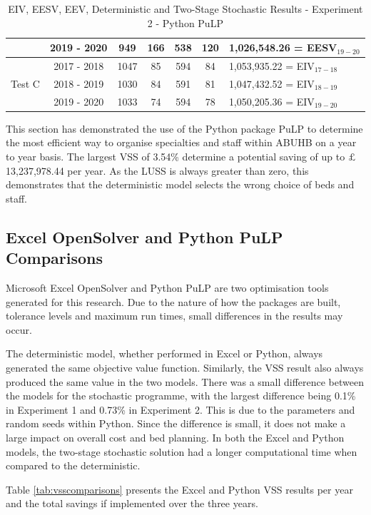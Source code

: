 \documentclass[../thesis.tex]{subfiles}
\begin{document}
\begin{table}[h!]
\begin{tabular}{ccccccl}
      & 2019 - 2020 &949 & 166 & 538 & 120 & 1,026,548.26 = EESV$_{19-20}$\\\midrule
       \multirow{3}{*}{Test C}& 2017 - 2018 &1047 & 85 & 594 & 84 & 1,053,935.22 = EIV$_{17-18}$\\
      & 2018 - 2019 &1030 & 84 & 591 & 81 & 1,047,432.52 = EIV$_{18-19}$\\
      & 2019 - 2020 &1033 & 74 & 594 & 78 & 1,050,205.36 = EIV$_{19-20}$\\\bottomrule      
    \end{tabular}
    \caption{EIV, EESV, EEV, Deterministic and Two-Stage Stochastic Results - Experiment 2 - Python PuLP}
    \label{tab:eiveesveevdetstocresultspy2}
\end{table}

This section has demonstrated the use of the Python package PuLP to determine the most efficient way to organise specialties and staff within ABUHB on a year to year basis. The largest VSS of 3.54\% determine a potential saving of up to $\pounds$13,237,978.44 per year. As the LUSS is always greater than zero, this demonstrates that the deterministic model selects the wrong choice of beds and staff.

\subsection{Excel OpenSolver and Python PuLP Comparisons}
Microsoft Excel OpenSolver and Python PuLP are two optimisation tools generated for this research. Due to the nature of how the packages are built, tolerance levels and maximum run times, small differences in the results may occur.

The deterministic model, whether performed in Excel or Python, always generated the same objective value function. Similarly, the VSS result also always produced the same value in the two models. There was a small difference between the models for the stochastic programme, with the largest difference being 0.1\% in Experiment 1 and 0.73\% in Experiment 2. This is due to the parameters and random seeds within Python. Since the difference is small, it does not make a large impact on overall cost and bed planning. In both the Excel and Python models, the two-stage stochastic solution had a longer computational time when compared to the deterministic.

Table \ref{tab:vsscomparisons} presents the Excel and Python VSS results per year and the total savings if implemented over the three years.
\end{document}
